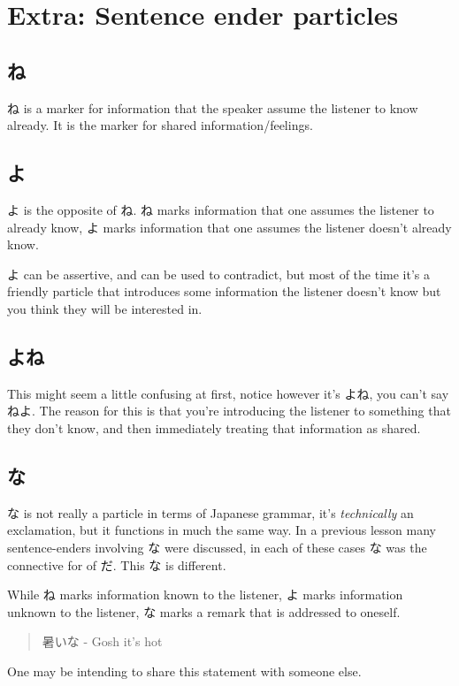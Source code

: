\documentclass[11pt]{article}
\begin{document}
\section{Extra: Sentence ender particles}
\label{sec:org7c36100}
\subsection{ね}
\label{sec:org8ad75d1}
ね is a marker for information that the speaker assume the listener to know already. It is the marker for shared information/feelings.

\subsection{よ}
\label{sec:org52d9889}
よ is the opposite of ね. ね marks information that one assumes the listener to already know, よ marks information that one assumes the listener doesn't already know.

よ can be assertive, and can be used to contradict, but most of the time it's a friendly particle that introduces some information the listener doesn't know but you think they will be interested in.

\subsection{よね}
\label{sec:org9f702c3}
This might seem a little confusing at first, notice however it's よね, you can't say ねよ. The reason for this is that you're introducing the listener to something that they don't know, and then immediately treating that information as shared.

\subsection{な}
\label{sec:orga804588}
な is not really a particle in terms of Japanese grammar, it's \emph{technically} an exclamation, but it functions in much the same way. In a previous lesson many sentence-enders involving な were discussed, in each of these cases な was the connective for of だ. This な is different.

While ね marks information known to the listener, よ marks information unknown to the listener, な marks a remark that is addressed to oneself.
\begin{quote}
暑いな - Gosh it's hot
\end{quote}
One may be intending to share this statement with someone else.
\end{document}
